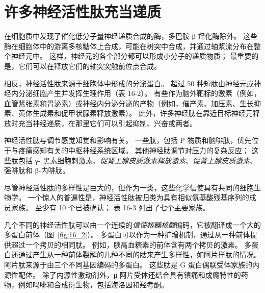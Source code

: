 \section{许多神经活性肽充当递质}

在细胞质中发现了催化低分子量神经递质合成的酶，多巴胺 β-羟化酶除外。
这些酶在细胞体中的游离多核糖体上合成，可能在树突中合成，并通过轴浆流分布在整个神经元中。
这样，神经元的各个部分都可以形成小分子的递质物质； 最重要的是，它们可以在释放它们的轴突突触前位点合成。


相反，神经活性肽来源于细胞体中形成的分泌蛋白。
超过 50 种短肽由神经元或神经内分泌细胞产生并发挥生理作用（表 16-2）。
有些作为脑外靶标的激素（例如，血管紧张素和胃泌素）或神经内分泌分泌的产物（例如，催产素、加压素、生长抑素、黄体生成素和促甲状腺素释放激素）。
此外，许多神经肽在靠近目标神经元释放时充当神经递质，在那里它们可以引起抑制、兴奋或两者。


神经活性肽与调节感觉知觉和影响有关。
一些肽，包括 P 物质和脑啡肽，优先位于与疼痛感知有关的中枢神经系统区域。
其他神经肽调节对压力的复杂反应；
这些肽包括 γ- 黑素细胞刺激素、\textit{促肾上腺皮质激素释放激素}、\textit{促肾上腺皮质激素}、强啡肽和 β-内啡肽。


尽管神经活性肽的多样性是巨大的，但作为一类，这些化学信使具有共同的细胞生物学。
一个惊人的普遍性是，神经活性肽被归类为具有相似氨基酸残基序列的成员家族。
至少有 10 个已被确认；
表 16-3 列出了七个主要家族。


几个不同的神经活性肽可以由一个连续的\textit{信使核糖核酸}编码，它被翻译成一个大的多蛋白前体（图~\ref{fig:16_2}）。
多蛋白可以作为一种扩增机制，通过从一种前体提供超过一个拷贝的相同肽。
例如，胰高血糖素的前体含有两个拷贝的激素。
多蛋白还通过产生从一种前体裂解的几种不同的肽来产生多样性，如阿片样肽的情况。
阿片肽来源于由三个不同基因编码的多蛋白。
这些肽是 G 蛋白偶联受体家族的内源性配体。
除了内源性激动剂外，μ 阿片受体还结合具有镇痛和成瘾特性的药物，例如吗啡和合成衍生物，包括海洛因和羟考酮。


